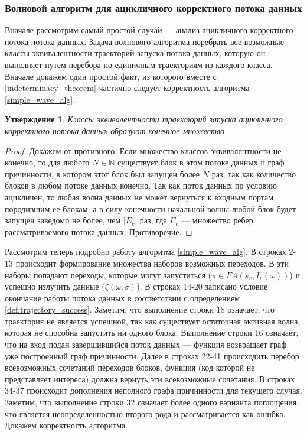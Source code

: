 \documentclass[10pt,a4paper]{article}
\newtheorem{theorem}{Утверждение}
\newcommand{\FA}{F\!A}
\begin{document}
\subsubsection{Волновой алгоритм для ацикличного корректного потока данных}
  Вначале рассмотрим самый простой случай --- анализ ацикличного корректного потока потока данных. Задача волнового алгоритма
  перебрать все возможные классы эквивалентности траекторий запуска потока данных, которую он выполняет путем перебора по единичным траекториям из каждого класса.
  Вначале докажем один простой факт, из которого вместе с \ref{indeterminacy_theorem} частично следует корректность алгоритма \ref{simple_wave_alg}.
  
  \begin{theorem}
    \label{finite_theorem}
    Классы эквивалентности траекторий запуска ацикличного корректного потока данных образуют конечное множество.
  \end{theorem}
  \begin{proof}
    Докажем от противного. Если множество классов эквивалентности не конечно, то для любого $N \in \mathbb{N}$ существует блок в этом потоке данных и граф причинности,
    в котором этот блок был запущен более $N$ раз, так как количество блоков в любом потоке данных конечно. Так как поток данных по условию ацикличен, то
    любая волна данных не может вернуться к входным портам породившим ее блокам, а в силу конечности начальной волны любой блок будет запущен
    заведомо не более, чем $\lvert E_c \rvert$ раз, где $E_c$ --- множество ребер рассматриваемого потока данных. Противоречие.
  \end{proof}
  
  Рассмотрим теперь подробно работу алгоритма \ref{simple_wave_alg}. В строках 2-13 происходит формирование множества наборов возможных переходов.
  В эти наборы попадают переходы, которые могут запуститься ($\pi \in \FA(s_v, I_v(\omega))$) и успешно излучить данные ($\zeta(\omega, \sigma)$).
  В строках 14-20 записано условие окончание работы потока данных в соответствии с определением \ref{def:trajectory_success}. Заметим, что выполнение
  строки 18 означает, что траектория не является успешной, так как существует остаточная активная волна, которая не способна запустить ни одного блока.
  Выполнение строки 16 означает, что на вход подан завершившийся поток данных --- функция возвращает граф уже построенный граф причинности.
  Далее в строках 22-41 происходить перебор всевозможных сочетаний переходов блоков, функция  (код которой не представляет интереса) должна вернуть
  эти всевозможные сочетания. В строках 34-37 происходит дополнения неполного графа причинности для текущего случая.
  Заметим, что выполнение строки 32 означает более одного варианта поглощения, что является неопределенностью второго рода и рассматривается как ошибка.
  Докажем корректность алгоритма.
  
\end{document}
